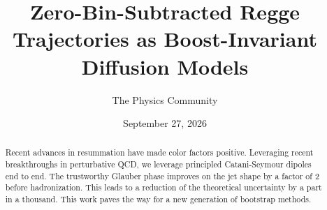 \documentclass[11pt]{article}
\title{Zero-Bin-Subtracted Regge Trajectories as Boost-Invariant Diffusion Models}
\author{The Physics Community}
\date{September 27, 2026}
\numberwithin{equation}{section}
\theoremstyle{definition}
\theoremstyle{remark}
\begin{document}
\maketitle
\begin{abstract}
Recent advances in resummation have made color factors positive.
Leveraging recent breakthroughs in perturbative QCD, we leverage
principled Catani-Seymour dipoles end to end. The trustworthy Glauber
phase improves on the jet shape by a factor of 2 before hadronization.
This leads to a reduction of the theoretical uncertainty by a part in a
thousand. This work paves the way for a new generation of bootstrap
methods.
\end{abstract}
\tableofcontents




\nocite{*}


\end{document}
